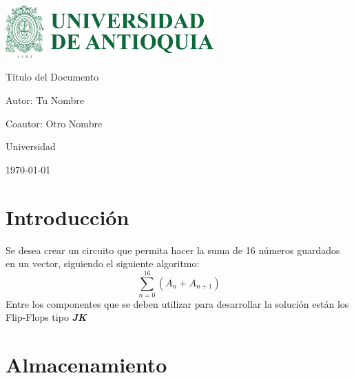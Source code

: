 \documentclass{article}
\begin{document}
\thispagestyle{fancy} %
\begin{titlepage}
    \centering
    \vspace*{2cm}
    {\includegraphics[width=8cm]{imagenes/logo.png}\par} %
    \vspace{1cm}
    {\Huge Título del Documento\par}
    \vspace{2cm}
    {\Large Autor: Tu Nombre\par}
    \vspace{0.5cm}
    {\Large Coautor: Otro Nombre\par} %
    \vspace{0.5cm}
    {\Large Universidad\par} %
    \vfill
    {\large \today\par}
\end{titlepage}

\section{Introducción}
Se desea crear un circuito que permita hacer la suma de 16 números guardados en un vector, 
siguiendo el siguiente algoritmo:
\[
\sum_{n=0}^{16} (A_n + A_{n+1})
\]
Entre los componentes que se deben utilizar para desarrollar la solución están los Flip-Flops
tipo \textbf{\textit{JK}}

\section{Almacenamiento}
\end{document}
